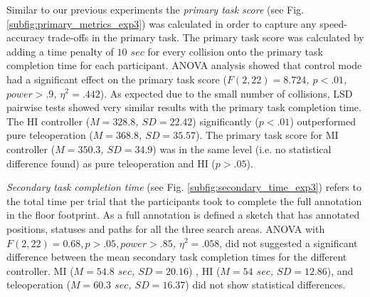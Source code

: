 \documentclass[a4paper,12pt,oneside,openright]{bhamthesis}
\begin{document}
Similar to our previous experiments the \textit{primary task score} (see Fig. \ref{subfig:primary_metrics_exp3}) was calculated in order to capture any speed-accuracy trade-offs in the primary task. The primary task score was calculated by adding a time penalty of \textit{$10$ $sec$} for every collision onto the primary task completion time for each participant. ANOVA analysis showed that control mode had a significant effect on the primary task score (\textit{$F(2, 22) = 8.724$, $p < .01$, $power > .9$, $\eta^2 = .442$}). As expected due to the small number of collisions, LSD pairwise tests showed very similar results with the primary task completion time. The HI controller (\textit{$M = 328.8$, $SD = 22.42$}) significantly (\textit{$p < .01$}) outperformed pure teleoperation (\textit{$M = 368.8$, $SD = 35.57$}). The primary task score for MI controller (\textit{$M = 350.3$, $SD = 34.9$}) was in the same level (i.e. no statistical difference found) as pure teleoperation and HI (\textit{$p > .05$}). 

\textit{Secondary task completion time} (see Fig. \ref{subfig:secondary_time_exp3}) refers to the total time per trial that the participants took to complete the full annotation in the floor footprint. As a full annotation is defined a sketch that has annotated positions, statuses and paths for all the three search areas. ANOVA with \textit{$F(2, 22) = 0.68, p > .05 , power > .85$, $\eta^2 = .058$}, did not suggested a significant difference between the mean secondary task completion times for the different controller. MI (\textit{$M = 54.8$ $sec$, $SD = 20.16$}) , HI (\textit{$M = 54$ $sec$, $SD = 12.86$}), and teleoperation (\textit{$M = 60.3$ $sec$, $SD = 16.37$}) did not show statistical differences.
\end{document}
